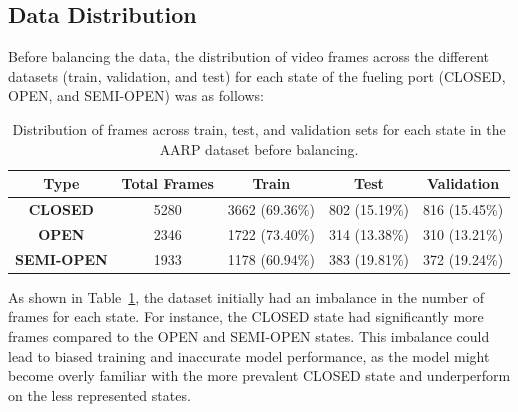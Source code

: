 \documentclass[12pt,oneside]{book} %
\begin{document}
\subsection{Data Distribution}
Before balancing the data, the distribution of video frames across the
different datasets (train, validation, and test) for each state of the fueling
port (CLOSED, OPEN, and SEMI-OPEN) was as follows:
\begin{table}[H]
    \centering
    \begin{tabular}{@{}ccccc@{}}
        \toprule
        \textbf{Type}      & \textbf{Total Frames} & \textbf{Train} & \textbf{Test} & \textbf{Validation} \\ \midrule
        \textbf{CLOSED}    & 5280                  & 3662 (69.36\%) & 802 (15.19\%) & 816 (15.45\%)       \\ 
        \textbf{OPEN}      & 2346                  & 1722 (73.40\%) & 314 (13.38\%) & 310 (13.21\%)       \\ 
        \textbf{SEMI-OPEN} & 1933                  & 1178 (60.94\%) & 383 (19.81\%) & 372 (19.24\%)       \\ \bottomrule
    \end{tabular}
    \caption{\centering Distribution of frames across train, test, and validation sets for each state in the AARP dataset before balancing.}
    \label{tab:frame_distribution}
\end{table}

\noindent As shown in Table~\ref{tab:frame_distribution}, the dataset initially had an
imbalance in the number of frames for each state. For instance, the CLOSED
state had significantly more frames compared to the OPEN and SEMI-OPEN states.
This imbalance could lead to biased training and inaccurate model performance,
as the model might become overly familiar with the more prevalent CLOSED state
and underperform on the less represented states.
\end{document}
